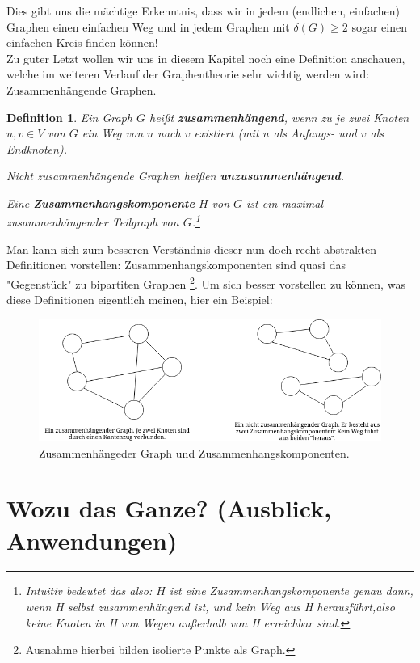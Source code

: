 \documentclass{article}
\newtheorem{definition}{Definition}
\theoremstyle{plain}
\begin{document}
Dies gibt uns die mächtige Erkenntnis, dass wir in jedem (endlichen, einfachen) Graphen einen einfachen Weg und in jedem Graphen mit $\delta(G) \geq 2$ sogar einen einfachen Kreis finden können!\\
\bigskip
Zu guter Letzt wollen wir uns in diesem Kapitel noch eine Definition anschauen, welche im weiteren Verlauf der Graphentheorie sehr wichtig werden wird: Zusammenhängende Graphen.\\
\begin{definition}
	Ein Graph $G$ heißt \textbf{zusammenhängend}, wenn zu je zwei Knoten $u, v \in V$ von $G$ ein \emph{Weg} von $u$ nach $v$ existiert (mit $u$ als Anfangs- und $v$ als Endknoten).
	\par\bigskip
	Nicht zusammenhängende Graphen heißen \textbf{unzusammenhängend}.
	\par\bigskip
	Eine \textbf{Zusammenhangskomponente} $H$ von $G$ ist ein \emph{maximal zusammenhängender Teilgraph} von $G$.\footnote[2]{Intuitiv bedeutet das also: $H$ ist eine Zusammenhangskomponente genau dann, wenn H selbst zusammenhängend ist, und \emph{kein Weg aus H herausführt},also keine Knoten in H von Wegen außerhalb von H erreichbar sind.}\cite[S.~11]{bue_1}
\end{definition}
Man kann sich zum besseren Verständnis dieser nun doch recht abstrakten Definitionen vorstellen: Zusammenhangskomponenten sind quasi das "Gegenstück" zu bipartiten Graphen \footnote[3]{Ausnahme hierbei bilden isolierte Punkte als Graph.}.
\bigskip
Um sich besser vorstellen zu können, was diese Definitionen eigentlich meinen, hier ein Beispiel:\\
\begin{figure}[!htp]
    \centering
    \includegraphics[width=13cm]{vortrag_schriftlich/images/zsmhaengend.drawio.png}
    \caption{Zusammenhängeder Graph und Zusammenhangskomponenten.}
    \label{fig:fig9}
\end{figure}

\newpage
\section[Wozu das Ganze?]{Wozu das Ganze? (Ausblick, Anwendungen)}
\end{document}
